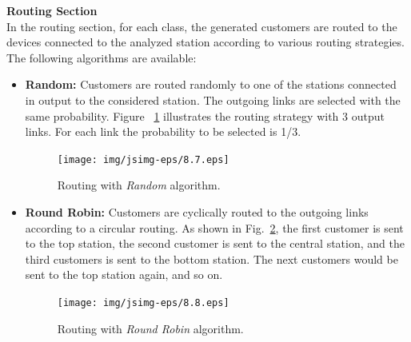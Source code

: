 \noindent \textbf{Routing Section}\\ In the routing section, for
each class, the generated customers are routed to the devices
connected to the analyzed station according to various routing
strategies. The following algorithms are available:
\begin{itemize}
\item \textbf{Random:} Customers are routed randomly to one of the
stations connected in output to the considered station. The
outgoing links are selected with the same probability. Figure
~\ref{fig:routrand} illustrates the routing strategy with 3 output
links. For each link the probability to be selected is 1/3.
\begin{figure}[htb]
    \begin{center}
        \texttt{[image: img/jsimg-eps/8.7.eps]}
    \end{center}
    \caption{Routing with \emph{Random} algorithm.}
    \label{fig:routrand}
\end{figure}

\item \textbf{Round Robin:} Customers are cyclically routed to the
outgoing links according to a circular routing. As shown in
Fig.~\ref{fig:routrr}, the first customer is sent to the top
station, the second customer is sent to the central station, and
the third customers is sent to the bottom station. The next
customers would be sent to the top station again, and so on.
\begin{figure}[htb]
    \begin{center}
        \texttt{[image: img/jsimg-eps/8.8.eps]}
    \end{center}
    \caption{Routing with \emph{Round Robin} algorithm.}
    \label{fig:routrr}
\end{figure}


\end{itemize}
